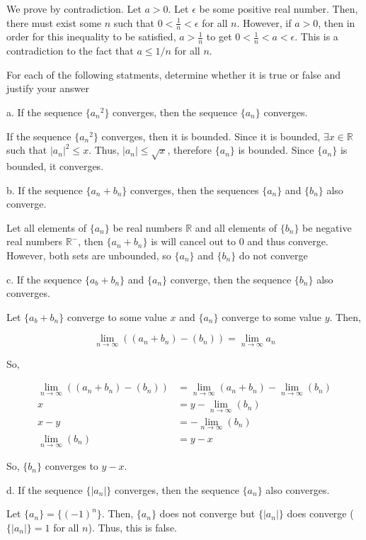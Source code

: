 \documentclass[addpoints]{exam}
\begin{document}
\begin{questions}
We prove by contradiction. Let $a > 0$. Let $\epsilon$ be some positive real number. 
Then, there must exist some $n$ such that $0 < \frac{1}{n} < \epsilon$ for all $n$. However, 
if $a > 0$, then in order for this inequality to be satisfied, $a > \frac{1}{n}$ to get 
$0 < \frac{1}{n} < a < \epsilon$. This is a contradiction to the fact that $a \leq 1/n$ for all $n$.

\question For each of the following statments, determine whether it is true or false and
justify your answer

a. If the sequence $\{{a_n}^2\}$ converges, then the sequence $\{a_n\}$ converges.

If the sequence $\{{a_n}^2\}$ converges, then it is bounded. Since it is bounded, 
$\exists x \in \mathbb{R}$ such that $|a_n|^2 \leq x$. Thus, $|a_n| \leq \sqrt{x}$, therefore 
$\{a_n\}$ is bounded. Since $\{a_n\}$ is bounded, it converges.

b. If the sequence $\{a_n + b_n\}$ converges, then the sequences $\{a_n\}$ and $\{b_n\}$ also converge.

Let all elements of $\{a_n\}$ be real numbers $\mathbb{R}$ and all elements of $\{b_n\}$ be negative 
real numbers $\mathbb{R}^-$, then $\{a_n + b_n\}$ is will cancel out to 0 and thus converge. However, 
both sets are unbounded, so $\{a_n\}$ and $\{b_n\}$ do not converge

c. If the sequence $\{a_b + b_n\}$ and $\{a_n\}$ converge, then the sequence $\{b_n\}$ also converges.

Let $\{a_b + b_n\}$ converge to some value $x$ and $\{a_n\}$ converge to some value $y$. Then,

$$\lim_{n \to \infty} ((a_n + b_n) - (b_n)) = \lim_{n \to \infty} a_n$$

So,

\begin{align*}
    \lim_{n \to \infty} ((a_n + b_n) - (b_n)) &= \lim_{n \to \infty} (a_n + b_n) - \lim_{n \to \infty} (b_n) \\ 
    x &= y - \lim_{n \to \infty} (b_n) \\
    x - y &= -\lim_{n \to \infty} (b_n) \\
    \lim_{n \to \infty} (b_n) &= y - x
\end{align*}

So, $\{b_n\}$ converges to $y - x$.

d. If the sequence $\{|a_n|\}$ converges, then the sequence $\{a_n\}$ also converges.

Let $\{a_n\} = \{(-1)^n\}$. Then, $\{a_n\}$ does not converge but $\{|a_n|\}$ does converge ($\{|a_n|\} = {1}$ for all $n$). Thus,
this is false.  

\end{questions}
\end{document}
